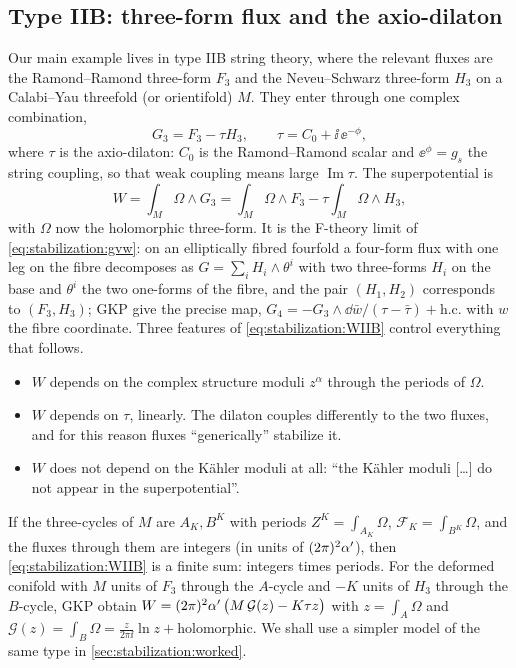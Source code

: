 \subsection{Type IIB: three-form flux and the axio-dilaton}

Our main example lives in type IIB string theory, where the relevant fluxes are the
Ramond--Ramond three-form $F_3$ and the Neveu--Schwarz three-form $H_3$ on a Calabi--Yau
threefold (or orientifold) $M$. They enter through one complex combination,
\begin{equation}\label{eq:stabilization:G3}
 G_3=F_3-\tau H_3,\qquad \tau=C_0+\ii\,\ee^{-\phi},
\end{equation}
where $\tau$ is the axio-dilaton: $C_0$ is the Ramond--Ramond scalar and
$\ee^{\phi}=g_s$ the string coupling, so that weak coupling means large $\operatorname{Im}\tau$.
The superpotential is 
\begin{equation}\label{eq:stabilization:WIIB}
 W=\int_M\Omega\wedge G_3=\int_M\Omega\wedge F_3-\tau\int_M\Omega\wedge H_3 ,
\end{equation}
with $\Omega$ now the holomorphic three-form. It is the F-theory limit of
\eqref{eq:stabilization:gvw}: on an elliptically fibred fourfold a four-form flux with one
leg on the fibre decomposes as $G=\sum_iH_i\wedge\theta^i$ with two three-forms $H_i$ on the
base and $\theta^i$ the two one-forms of the fibre,  and the pair $(H_1,H_2)$ corresponds to $(F_3,H_3)$; GKP give the precise
map, $G_4=-G_3\wedge\dd\bar w/(\tau-\bar\tau)+\text{h.c.}$ with $w$ the fibre coordinate.
 Three features of
\eqref{eq:stabilization:WIIB} control everything that follows.
\begin{itemize}[leftmargin=*,itemsep=1pt]
\item $W$ depends on the complex structure moduli $z^\alpha$ through the periods of $\Omega$.
\item $W$ depends on $\tau$, linearly. The dilaton couples differently to the two fluxes, and
 for this reason fluxes ``generically'' stabilize it. 
\item $W$ does not depend on the K\"ahler moduli at all: ``the K\"ahler moduli [\dots] do not
 appear in the superpotential''. 
\end{itemize}
If the three-cycles of $M$ are $A_K,B^K$ with periods $Z^K=\int_{A_K}\Omega$,
$\mathcal F_K=\int_{B^K}\Omega$, and the fluxes through them are integers (in units of
$(2\pi)^2\alpha'$), then \eqref{eq:stabilization:WIIB} is a finite sum: integers times periods.
For the deformed conifold with $M$ units of $F_3$ through the $A$-cycle and $-K$ units of
$H_3$ through the $B$-cycle, GKP obtain $W=(2\pi)^2\alpha'\,\bigl(M\,\mathcal G(z)-K\tau z\bigr)$ with
$z=\int_A\Omega$ and $\mathcal G(z)=\int_B\Omega=\frac{z}{2\pi\ii}\ln z+{}$holomorphic.
 We shall use a simpler model of the same
type in \cref{sec:stabilization:worked}.

